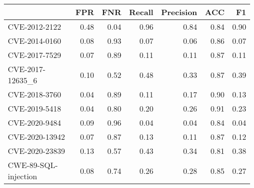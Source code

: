 \begin{tabular}{lrrrrrr}
\toprule
{} &  FPR &  FNR &  Recall &  Precision &  ACC &   F1 \\
\midrule
CVE-2012-2122        & 0.48 & 0.04 &    0.96 &       0.84 & 0.84 & 0.90 \\
CVE-2014-0160        & 0.08 & 0.93 &    0.07 &       0.06 & 0.86 & 0.07 \\
CVE-2017-7529        & 0.07 & 0.89 &    0.11 &       0.11 & 0.87 & 0.11 \\
CVE-2017-12635\_6     & 0.10 & 0.52 &    0.48 &       0.33 & 0.87 & 0.39 \\
CVE-2018-3760        & 0.04 & 0.89 &    0.11 &       0.17 & 0.90 & 0.13 \\
CVE-2019-5418        & 0.04 & 0.80 &    0.20 &       0.26 & 0.91 & 0.23 \\
CVE-2020-9484        & 0.09 & 0.96 &    0.04 &       0.04 & 0.84 & 0.04 \\
CVE-2020-13942       & 0.07 & 0.87 &    0.13 &       0.11 & 0.87 & 0.12 \\
CVE-2020-23839       & 0.13 & 0.57 &    0.43 &       0.34 & 0.81 & 0.38 \\
CWE-89-SQL-injection & 0.08 & 0.74 &    0.26 &       0.28 & 0.85 & 0.27 \\
\bottomrule
\end{tabular}
